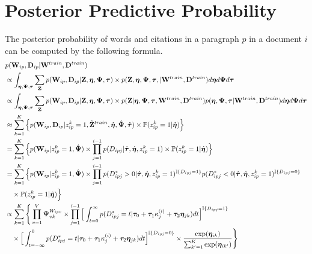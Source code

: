 \section{Posterior Predictive Probability}
\label{sec:predictive}

The posterior probability of words and citations in a paragraph $p$ in a document $i$ can be computed by the following formula.
\begin{equation}
\begin{split}
  &p(\mathbf{W}_{ip}, \mathbf{D}_{ip} \vert \mathbf{W}^{train}, \mathbf{D}^{train}) \\
  &\propto \int_{{\boldsymbol \eta}, {\boldsymbol \Psi}, {\boldsymbol \tau}} \sum_{\mathbf{Z}} p(\mathbf{W}_{ip}, \mathbf{D}_{ip} \vert \mathbf{Z}, {\boldsymbol \eta}, {\boldsymbol \Psi}, {\boldsymbol \tau}) 
  \times p(\mathbf{Z}, {\boldsymbol \eta}, {\boldsymbol \Psi}, {\boldsymbol \tau}, \vert \mathbf{W}^{train}, \mathbf{D}^{train}) d{\boldsymbol \eta} d{\boldsymbol \Psi} d{\boldsymbol \tau} \\
  &\propto \int_{{\boldsymbol \eta}, {\boldsymbol \Psi}, {\boldsymbol \tau}} \sum_{\mathbf{Z}} p(\mathbf{W}_{ip}, \mathbf{D}_{ip} \vert \mathbf{Z}, {\boldsymbol \eta}, {\boldsymbol \Psi}, {\boldsymbol \tau}) 
  \times p(\mathbf{Z} \vert {\boldsymbol \eta}, {\boldsymbol \Psi}, {\boldsymbol \tau}, \mathbf{W}^{train}, \mathbf{D}^{train}) p( {\boldsymbol \eta}, {\boldsymbol \Psi}, {\boldsymbol \tau} \vert \mathbf{W}^{train}, \mathbf{D}^{train}) d{\boldsymbol \eta} d{\boldsymbol \Psi} d{\boldsymbol \tau} \\
  &\approx \sum_{k=1}^K \Big\{ p(\mathbf{W}_{ip}, \mathbf{D}_{ip} \vert z_{ip}^k = 1, \hat{\mathbf{Z}}^{train}, \hat{{\boldsymbol \eta}}, \hat{{\boldsymbol \Psi}}, \hat{{\boldsymbol \tau}}) \times \mathbb{P}(z_{ip}^k = 1 \vert \hat{{\boldsymbol \eta}}) \Big\} \\
  &= \sum_{k=1}^K \Big\{ p(\mathbf{W}_{ip} \vert z_{ip}^k = 1, \hat{{\boldsymbol \Psi}})
  \times \prod_{j=1}^{i-1} p(D_{ipj} \vert \hat{{\boldsymbol \tau}}, \hat{{\boldsymbol \eta}}, z_{ip}^k = 1)
  \times \mathbb{P}(z_{ip}^k = 1 \vert \hat{{\boldsymbol \eta}}) \Big\} \\
  &= \sum_{k=1}^K \Big\{ p(\mathbf{W}_{ip} \vert z_{ip}^k = 1, \hat{{\boldsymbol \Psi}})
  \times \prod_{j=1}^{i-1} p(D_{ipj}^* > 0 \vert \hat{{\boldsymbol \tau}}, \hat{{\boldsymbol \eta}}, z_{ip}^k = 1)^{\mathbb{I}\{D_{ipj}=1\}} p(D_{ipj}^* < 0 \vert \hat{{\boldsymbol \tau}}, \hat{{\boldsymbol \eta}}, z_{ip}^k = 1)^{\mathbb{I}\{D_{ipj}=0\}} \\
  &\quad \times \mathbb{P}(z_{ip}^k = 1 \vert \hat{{\boldsymbol \eta}}) \Big\} \\
  &\propto \sum_{k=1}^K \Bigg\{ \prod_{v=1}^V {\boldsymbol \Psi}_{vk}^{W_{ipv}} 
  \times \prod_{j=1}^{i-1} \Big[\int_{t=0}^{\infty} p(D_{ipj}^* = t | {\boldsymbol \tau}_0 + {\boldsymbol \tau}_1 \kappa_j^{(i)} + {\boldsymbol \tau}_2{\boldsymbol \eta}_{jk}) dt\Big]^{\mathbb{I}\{D_{ipj}=1\}} \\
  &\quad \times \Big[\int_{t=-\infty}^{0} p(D_{ipj}^* = t | {\boldsymbol \tau}_0 + {\boldsymbol \tau}_1 \kappa_j^{(i)} + {\boldsymbol \tau}_2{\boldsymbol \eta}_{jk}) dt \Big]^{\mathbb{I}\{D_{ipj}=0\}} 
  \times \frac{\exp({\boldsymbol \eta}_{ik})}{\sum_{k'=1}^K \exp({\boldsymbol \eta}_{ik'})} \Bigg\} \\
\end{split}
\end{equation}
